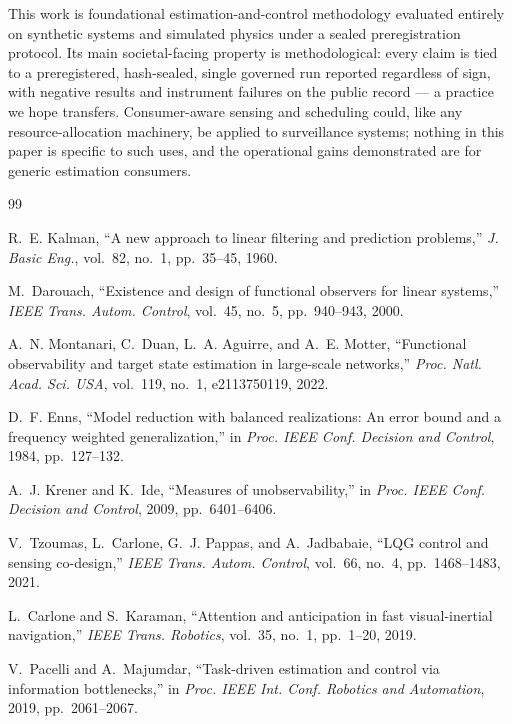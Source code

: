 \documentclass{article}
\theoremstyle{definition}
\theoremstyle{remark}
\begin{document}
This work is foundational estimation-and-control methodology evaluated
entirely on synthetic systems and simulated physics under a sealed
preregistration protocol. Its main societal-facing property is
methodological: every claim is tied to a preregistered, hash-sealed,
single governed run reported regardless of sign, with negative results
and instrument failures on the public record --- a practice we hope
transfers. Consumer-aware sensing and scheduling could, like any
resource-allocation machinery, be applied to surveillance systems;
nothing in this paper is specific to such uses, and the operational
gains demonstrated are for generic estimation consumers.

\begin{thebibliography}{99}\footnotesize

 R.~E. Kalman, ``A new approach to linear filtering and
prediction problems,'' \emph{J. Basic Eng.}, vol.~82, no.~1, pp.~35--45, 1960.

 M.~Darouach, ``Existence and design of functional
observers for linear systems,'' \emph{IEEE Trans. Autom. Control}, vol.~45,
no.~5, pp.~940--943, 2000.

 A.~N. Montanari, C.~Duan, L.~A. Aguirre, and A.~E.
Motter, ``Functional observability and target state estimation in large-scale
networks,'' \emph{Proc. Natl. Acad. Sci. USA}, vol.~119, no.~1, e2113750119,
2022.

 D.~F. Enns, ``Model reduction with balanced realizations:
An error bound and a frequency weighted generalization,'' in \emph{Proc. IEEE
Conf. Decision and Control}, 1984, pp.~127--132.

 A.~J. Krener and K.~Ide, ``Measures of
unobservability,'' in \emph{Proc. IEEE Conf. Decision and Control}, 2009,
pp.~6401--6406.

 V.~Tzoumas, L.~Carlone, G.~J. Pappas, and
A.~Jadbabaie, ``LQG control and sensing co-design,'' \emph{IEEE Trans.
Autom. Control}, vol.~66, no.~4, pp.~1468--1483, 2021.

 L.~Carlone and S.~Karaman, ``Attention and anticipation
in fast visual-inertial navigation,'' \emph{IEEE Trans. Robotics}, vol.~35,
no.~1, pp.~1--20, 2019.

 V.~Pacelli and A.~Majumdar, ``Task-driven estimation and
control via information bottlenecks,'' in \emph{Proc. IEEE Int. Conf.
Robotics and Automation}, 2019, pp.~2061--2067.


\end{thebibliography}
\end{document}
